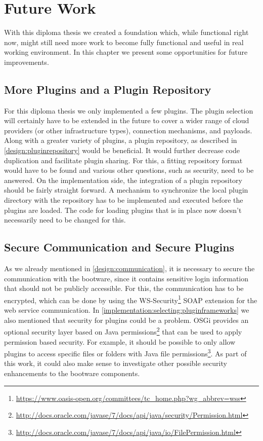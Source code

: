 \chapter{Future Work}

With this diploma thesis we created a foundation which, while functional right now, might still need more work to become fully functional and useful in real working environment.
In this chapter we present some opportunities for future improvements.

\section{More Plugins and a Plugin Repository}

For this diploma thesis we only implemented a few plugins.
The plugin selection will certainly have to be extended in the future to cover a wider range of cloud providers (or other infrastructure types), connection mechanisms, and payloads.
Along with a greater variety of plugins, a plugin repository, as described in \autoref{design:pluginrepository} would be beneficial.
It would further decrease code duplication and facilitate plugin sharing.
For this, a fitting repository format would have to be found and various other questions, such as security, need to be answered.
On the implementation side, the integration of a plugin repository should be fairly straight forward.
A mechanism to synchronize the local plugin directory with the repository has to be implemented and executed before the plugins are loaded.
The code for loading plugins that is in place now doesn't necessarily need to be changed for this.

\section{Secure Communication and Secure Plugins}

As we already mentioned in \autoref{design:communication}, it is necessary to secure the communication with the bootware, since it contains sensitive login information that should not be publicly accessible.
For this, the communication has to be encrypted, which can be done by using the WS-Security\footnote{\url{https://www.oasis-open.org/committees/tc_home.php?wg_abbrev=wss}} SOAP extension for the web service communication.
In \autoref{implementation:selecting:pluginframeworks} we also mentioned that security for plugins could be a problem.
OSGi provides an optional security layer based on Java permissions\footnote{\url{http://docs.oracle.com/javase/7/docs/api/java/security/Permission.html}} that can be used to apply permission based security.
For example, it should be possible to only allow plugins to access specific files or folders with Java file permissions\footnote{\url{http://docs.oracle.com/javase/7/docs/api/java/io/FilePermission.html}}.
As part of this work, it could also make sense to investigate other possible security enhancements to the bootware components.

